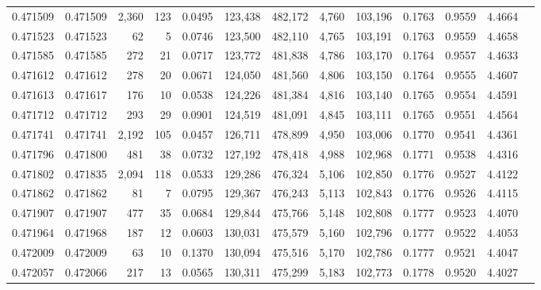 \begin{tabular}{rrrrrrrrrrrrr}
0.471509 & 0.471509 & 2,360 &   123 &                                     0.0495 & 123,438 & 482,172 &   4,760 & 103,196 & 0.1763 & 0.9559 & 4.4664 \\
0.471523 & 0.471523 &    62 &     5 &                                     0.0746 & 123,500 & 482,110 &   4,765 & 103,191 & 0.1763 & 0.9559 & 4.4658 \\
0.471585 & 0.471585 &   272 &    21 &                                     0.0717 & 123,772 & 481,838 &   4,786 & 103,170 & 0.1764 & 0.9557 & 4.4633 \\
0.471612 & 0.471612 &   278 &    20 &                                     0.0671 & 124,050 & 481,560 &   4,806 & 103,150 & 0.1764 & 0.9555 & 4.4607 \\
0.471613 & 0.471617 &   176 &    10 &                                     0.0538 & 124,226 & 481,384 &   4,816 & 103,140 & 0.1765 & 0.9554 & 4.4591 \\
0.471712 & 0.471712 &   293 &    29 &                                     0.0901 & 124,519 & 481,091 &   4,845 & 103,111 & 0.1765 & 0.9551 & 4.4564 \\
0.471741 & 0.471741 & 2,192 &   105 &                                     0.0457 & 126,711 & 478,899 &   4,950 & 103,006 & 0.1770 & 0.9541 & 4.4361 \\
0.471796 & 0.471800 &   481 &    38 &                                     0.0732 & 127,192 & 478,418 &   4,988 & 102,968 & 0.1771 & 0.9538 & 4.4316 \\
0.471802 & 0.471835 & 2,094 &   118 &                                     0.0533 & 129,286 & 476,324 &   5,106 & 102,850 & 0.1776 & 0.9527 & 4.4122 \\
0.471862 & 0.471862 &    81 &     7 &                                     0.0795 & 129,367 & 476,243 &   5,113 & 102,843 & 0.1776 & 0.9526 & 4.4115 \\
0.471907 & 0.471907 &   477 &    35 &                                     0.0684 & 129,844 & 475,766 &   5,148 & 102,808 & 0.1777 & 0.9523 & 4.4070 \\
0.471964 & 0.471968 &   187 &    12 &                                     0.0603 & 130,031 & 475,579 &   5,160 & 102,796 & 0.1777 & 0.9522 & 4.4053 \\
0.472009 & 0.472009 &    63 &    10 &                                     0.1370 & 130,094 & 475,516 &   5,170 & 102,786 & 0.1777 & 0.9521 & 4.4047 \\
0.472057 & 0.472066 &   217 &    13 &                                     0.0565 & 130,311 & 475,299 &   5,183 & 102,773 & 0.1778 & 0.9520 & 4.4027 \\

\end{tabular}

